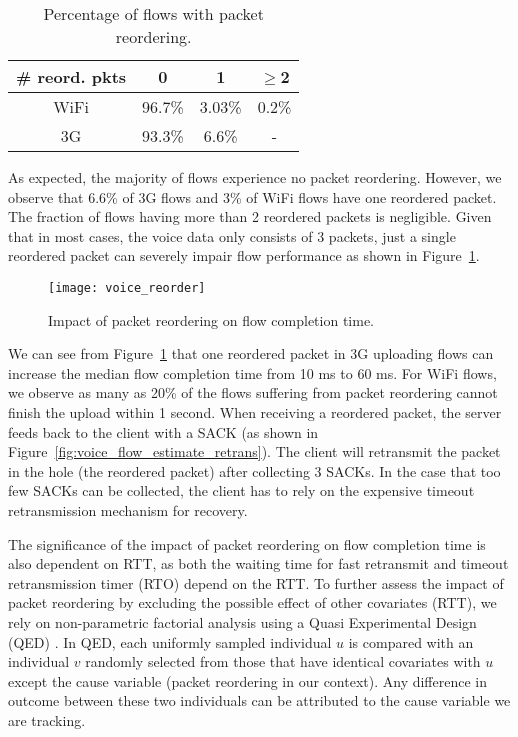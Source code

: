 \begin{table}[th]
\caption{Percentage of flows with packet reordering.}
\label{tab:voice_reorder}
\centering
\renewcommand{\arraystretch}{1.0}
\begin{tabular}{c|c|c|c}
	\hline
	\# reord. pkts & 0 & 1 & $\ge$2 \\
	\hline
	WiFi & 96.7\% & 3.03\% & 0.2\% \\
	\hline
	3G & 93.3\% & 6.6\% & - \\
	\hline
\end{tabular}
\end{table}

As expected, the majority of flows experience no packet reordering. However, we observe that 6.6\% of 3G flows and 3\% of WiFi flows have one reordered packet. The fraction of flows having more than 2 reordered packets is negligible. Given that in most cases, the voice data only consists of 3 packets, just a single reordered packet can severely impair flow performance as shown in Figure~\ref{fig:voice_reorder}.

\begin{figure}[th]
\centering
	\texttt{[image: voice\_reorder]}
\caption{Impact of packet reordering on flow completion time.}
\label{fig:voice_reorder}
\end{figure}

We can see from Figure~\ref{fig:voice_reorder} that one reordered packet in 3G uploading flows can increase the median flow completion time from 10 ms to 60 ms. For WiFi flows, we observe as many as 20\% of the flows suffering from packet reordering cannot finish the upload within 1 second. When receiving a reordered packet, the server feeds back to the client with a SACK (as shown in Figure~\ref{fig:voice_flow_estimate_retrans}). The client will retransmit the packet in the hole (\ie the reordered packet) after collecting 3 SACKs. In the case that too few SACKs can be collected, the client has to rely on the expensive timeout retransmission mechanism for recovery. %

The significance of the impact of packet reordering on flow completion time is also dependent on RTT, as both the waiting time for fast retransmit and timeout retransmission timer (\ie RTO) depend on the RTT. To further assess the impact of packet reordering by excluding the possible effect of other covariates (\eg RTT), we rely on non-parametric factorial analysis using a Quasi Experimental Design (QED) \cite{krishnan2013video}. In QED, each uniformly sampled individual $u$ is compared with an individual $v$ randomly selected from those that have identical covariates with $u$ except the cause variable (packet reordering in our context). Any difference in outcome between these two individuals can be attributed to the cause variable we are tracking.


